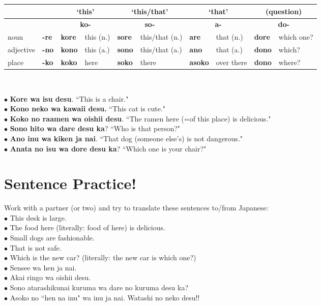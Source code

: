 \documentclass[11pt]{article} %
\newcommand{\ee}{\vspace{.10cm}\\} %
\begin{document}
\begin{tabular}{l l||l l | l l | l l | l l}
& & \multicolumn{2}{c}{`this' } & \multicolumn{2}{c}{`this/that'} & \multicolumn{2}{c}{`that'} & \multicolumn{2}{c}{(question)}\\
\hline
& & \multicolumn{2}{c}{\textbf{ko-}} & \multicolumn{2}{c}{\textbf{so-}} & \multicolumn{2}{c}{\textbf{a-}} & \multicolumn{2}{c}{\textbf{do-}}\\
\hline
noun & \textbf{-re}& \textbf{kore} & this (n.) & \textbf{sore} & this/that (n.) & \textbf{are} & that (n.) & \textbf{dore} & which one? \\
adjective & \textbf{-no}& \textbf{kono} & this (a.) & \textbf{sono} & this/that (a.) & \textbf{ano} & that (a.) & \textbf{dono} & which? \\
place & \textbf{-ko}& \textbf{koko} & here & \textbf{soko} & there & \textbf{\textbf{asoko}} & over there & \textbf{dono} & where? \\
\end{tabular}\\\vspace{1cm}

$\bullet$ \textbf{Kore wa isu desu}.  ``This is a chair."\\
$\bullet$ \textbf{Kono neko wa kawaii desu.} ``This cat is cute."\\
$\bullet$ \textbf{Koko no raamen wa oishii desu}. ``The ramen here (=of this place) is delicious."\ee

$\bullet$ \textbf{Sono hito wa dare desu ka}?  ``Who is that person?"\ee

$\bullet$ \textbf{Ano inu wa kiken ja nai}.  ``That dog (someone else's) is not dangerous."\ee

$\bullet$ \textbf{Anata no isu wa dore desu ka}?  ``Which one is your chair?"\\


\section{Sentence Practice!}

Work with a partner (or two) and try to translate these sentences to/from Japanese:\ee

$\bullet$ This desk is large.\\
$\bullet$ The food here (literally: food of here) is delicious.\\
$\bullet$ Small dogs are fashionable.\\
$\bullet$ That is not safe.\\
$\bullet$ Which is the new car? (literally: the new car is which one?)\ee

$\bullet$ Sensee wa hen ja nai.\\
$\bullet$ Akai ringo wa oishii desu.\\
$\bullet$ Sono atarashikunai kuruma wa dare no kuruma desu ka?\\
$\bullet$ Asoko no ``hen na inu" wa inu ja nai.  Watashi no neko desu!! 
\end{document}
